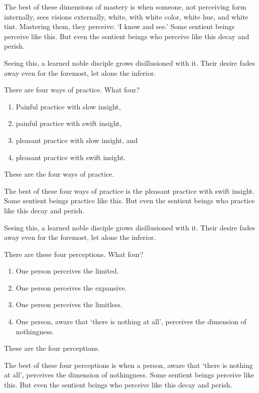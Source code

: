 \documentclass[12pt,openany]{book}%
\begin{document}
The best of these dimensions of mastery is when someone, not perceiving form internally, sees visions externally, white, with white color, white hue, and white tint. Mastering them, they perceive: ‘I know and see.’ Some sentient beings perceive like this. But even the sentient beings who perceive like this decay and perish. 

Seeing this, a learned noble disciple grows disillusioned with it. Their desire fades away even for the foremost, let alone the inferior. 

There are four ways of practice. What four? 

\begin{enumerate}%
\item Painful practice with slow insight, %
\item painful practice with swift insight, %
\item pleasant practice with slow insight, and %
\item pleasant practice with swift insight. %
\end{enumerate}

These are the four ways of practice. 

The best of these four ways of practice is the pleasant practice with swift insight. Some sentient beings practice like this. But even the sentient beings who practice like this decay and perish. 

Seeing this, a learned noble disciple grows disillusioned with it. Their desire fades away even for the foremost, let alone the inferior. 

There are these four perceptions. What four? 

\begin{enumerate}%
\item One person perceives the limited. %
\item One person perceives the expansive. %
\item One person perceives the limitless. %
\item One person, aware that ‘there is nothing at all’, perceives the dimension of nothingness. %
\end{enumerate}

These are the four perceptions. 

The best of these four perceptions is when a person, aware that ‘there is nothing at all’, perceives the dimension of nothingness. Some sentient beings perceive like this. But even the sentient beings who perceive like this decay and perish. 
\end{document}
